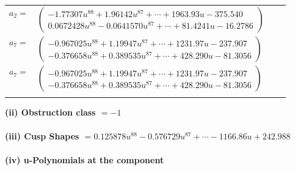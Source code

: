 \documentclass[1p]{elsarticle_modified}
\theoremstyle{definition}
\begin{document}
\begin{tabular}{m{7pt} m{180pt} m{7pt} m{180pt} }
\flushright $a_{2}=$&$\begin{pmatrix}-1.77307 u^{88}+1.96142 u^{87}+\cdots+1963.93 u-375.540\\0.0672428 u^{88}-0.0641570 u^{87}+\cdots+81.4241 u-16.2786\end{pmatrix}$ \\
\flushright $a_{7}=$&$\begin{pmatrix}-0.967025 u^{88}+1.19947 u^{87}+\cdots+1231.97 u-237.907\\-0.376658 u^{88}+0.389535 u^{87}+\cdots+428.290 u-81.3056\end{pmatrix}$\\ \flushright $a_{7}=$&$\begin{pmatrix}-0.967025 u^{88}+1.19947 u^{87}+\cdots+1231.97 u-237.907\\-0.376658 u^{88}+0.389535 u^{87}+\cdots+428.290 u-81.3056\end{pmatrix}$\\&\end{tabular}
\flushleft \textbf{(ii) Obstruction class $= -1$}\\~\\
\flushleft \textbf{(iii) Cusp Shapes $= 0.125878 u^{88}-0.576729 u^{87}+\cdots-1166.86 u+242.988$}\\~\\
\newpage\renewcommand{\arraystretch}{1}
\flushleft \textbf{(iv) u-Polynomials at the component}\newline \\
\end{document}
